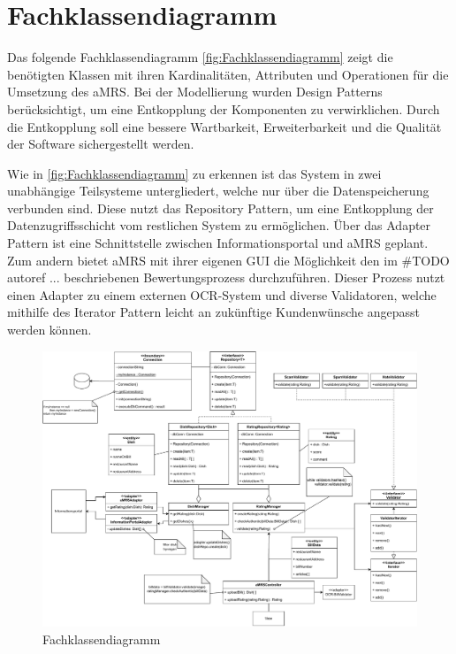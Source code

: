 \section{Fachklassendiagramm}

\noindent Das folgende Fachklassendiagramm \autoref{fig:Fachklassendiagramm} zeigt die benötigten Klassen mit ihren
Kardinalitäten, Attributen und Operationen für die Umsetzung des \ac{aMRS}. Bei der Modellierung wurden Design Patterns
berücksichtigt, um eine Entkopplung der Komponenten zu verwirklichen. Durch die Entkopplung soll eine bessere
Wartbarkeit, Erweiterbarkeit und die Qualität der Software sichergestellt werden. \newline

\noindent Wie in \autoref{fig:Fachklassendiagramm} zu erkennen ist das System in zwei unabhängige Teilsysteme
untergliedert, welche nur über die Datenspeicherung verbunden sind. Diese nutzt das Repository Pattern, um eine
Entkopplung der Datenzugriffsschicht vom restlichen System zu ermöglichen. Über das Adapter Pattern ist eine
Schnittstelle zwischen Informationsportal und \ac{aMRS} geplant. Zum andern bietet \ac{aMRS} mit ihrer eigenen GUI die
Möglichkeit den im \#TODO autoref ... beschriebenen Bewertungsprozess durchzuführen. Dieser Prozess nutzt einen Adapter
zu einem externen OCR-System und diverse Validatoren, welche mithilfe des Iterator Pattern leicht an zukünftige
Kundenwünsche angepasst werden können.

\newpage

\begin{figure}[H]
    \centering
    \caption{Fachklassendiagramm} \label{fig:Fachklassendiagramm}
    \includegraphics[width=1.3\textwidth,angle=90,keepaspectratio]{images/Fachklassenmodell}
\end{figure}

